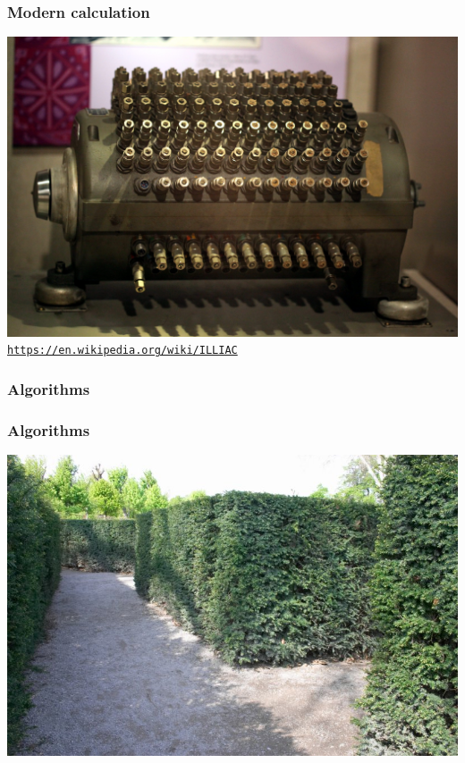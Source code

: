 \documentclass[11pt]{beamer}
\begin{document}
\begin{frame}[fragile]
	\frametitle{Modern calculation}
	
	\includegraphics[height=0.75\textheight]{./img/illiac.jpg}\\
	\textcolor{\CSBase}{\small \texttt{\url{https://en.wikipedia.org/wiki/ILLIAC}}}
\end{frame}


\begin{frame}[fragile]
  \frametitle{Algorithms}
\end{frame}

\begin{frame}[fragile]
  \frametitle{Algorithms}

  \includegraphics[height=0.75\textheight]{./img/hedge-maze.jpg}
\end{frame}
\end{document}
